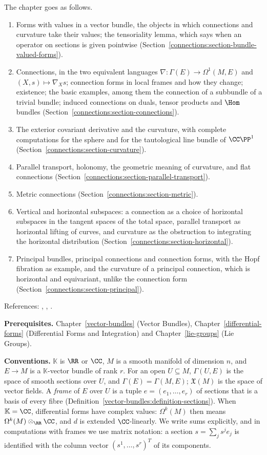 The chapter goes as follows.
\begin{enumerate}
\item Forms with values in a vector bundle, the objects in which connections and curvature take their values; the tensoriality lemma, which says when an operator on
sections is given pointwise (Section~\ref{connections:section-bundle-valued-forms}).
\item Connections, in the two equivalent languages $\nabla \colon \Gamma(E) \to \Omega^1(M, E)$ and $(X, s) \mapsto \nabla_Xs$; connection forms in local frames and how they
change; existence; the basic examples, among them the connection of a subbundle of a trivial bundle; induced connections on duals, tensor products and
$\Hom$ bundles (Section~\ref{connections:section-connections}).
\item The exterior covariant derivative and the curvature, with complete computations for the sphere and for the tautological line bundle of $\CC\PP^1$
(Section~\ref{connections:section-curvature}).
\item Parallel transport, holonomy, the geometric meaning of curvature, and flat connections (Section~\ref{connections:section-parallel-transport}).
\item Metric connections (Section~\ref{connections:section-metric}).
\item Vertical and horizontal subspaces: a connection as a choice of horizontal subspaces in the tangent spaces of the total space, parallel transport as horizontal
lifting of curves, and curvature as the obstruction to integrating the horizontal distribution (Section~\ref{connections:section-horizontal}).
\item Principal bundles, principal connections and connection forms, with the Hopf fibration as example, and the curvature of a principal connection, which is horizontal and
equivariant, unlike the connection form (Section~\ref{connections:section-principal}).
\end{enumerate}
References: \cite{kobayashi-nomizu}, \cite{milnor-stasheff}, \cite[Chapter 0]{griffiths-harris}.

\noindent\textbf{Prerequisites.} Chapter~\ref{vector-bundles} (Vector Bundles), Chapter~\ref{differential-forms} (Differential Forms
and Integration) and Chapter~\ref{lie-groups} (Lie Groups).

\noindent\textbf{Conventions.} $\mathbb{K}$ is $\RR$ or $\CC$, $M$ is a smooth manifold of dimension $n$, and $E \to M$ is a $\mathbb{K}$-vector bundle of rank $r$. For an open
$U \subseteq M$, $\Gamma(U, E)$ is the space of smooth sections over $U$, and $\Gamma(E) = \Gamma(M, E)$; $\mathfrak{X}(M)$ is the space of vector fields. A \emph{frame} of $E$
over $U$ is a tuple $e = (e_1, \ldots, e_r)$ of sections that is a basis of every fibre (Definition~\ref{vector-bundles:definition-sections}). When $\mathbb{K} = \CC$,
differential forms have complex values: $\Omega^k(M)$ then means $\Omega^k(M) \otimes_\RR \CC$, and $d$ is extended $\CC$-linearly. We write sums explicitly, and in
computations with frames we use matrix notation: a section $s = \sum_js^je_j$ is identified with the column vector $(s^1, \ldots, s^r)^T$ of its components.

